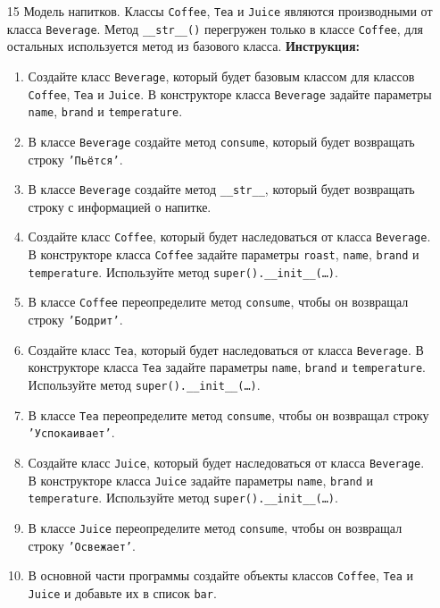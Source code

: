 \begin{enumerate}
\begin{enumerate}
\end{enumerate}
\item[15]
Модель напитков. Классы \texttt{Coffee}, \texttt{Tea} и \texttt{Juice} являются производными от класса \texttt{Beverage}. Метод \texttt{\_\_str\_\_()} перегружен только в классе \texttt{Coffee}, для остальных используется метод из базового класса.
\textbf{Инструкция:}
\begin{enumerate}
    \item Создайте класс \texttt{Beverage}, который будет базовым классом для классов \texttt{Coffee}, \texttt{Tea} и \texttt{Juice}. В конструкторе класса \texttt{Beverage} задайте параметры \texttt{name}, \texttt{brand} и \texttt{temperature}.
    \item В классе \texttt{Beverage} создайте метод \texttt{consume}, который будет возвращать строку \texttt{'Пьётся'}.
    \item В классе \texttt{Beverage} создайте метод \texttt{\_\_str\_\_}, который будет возвращать строку с информацией о напитке.
    \item Создайте класс \texttt{Coffee}, который будет наследоваться от класса \texttt{Beverage}. В конструкторе класса \texttt{Coffee} задайте параметры \texttt{roast}, \texttt{name}, \texttt{brand} и \texttt{temperature}. Используйте метод \texttt{super().\_\_init\_\_(\ldots)}.
    \item В классе \texttt{Coffee} переопределите метод \texttt{consume}, чтобы он возвращал строку \texttt{'Бодрит'}.
    \item Создайте класс \texttt{Tea}, который будет наследоваться от класса \texttt{Beverage}. В конструкторе класса \texttt{Tea} задайте параметры \texttt{name}, \texttt{brand} и \texttt{temperature}. Используйте метод \texttt{super().\_\_init\_\_(\ldots)}.
    \item В классе \texttt{Tea} переопределите метод \texttt{consume}, чтобы он возвращал строку \texttt{'Успокаивает'}.
    \item Создайте класс \texttt{Juice}, который будет наследоваться от класса \texttt{Beverage}. В конструкторе класса \texttt{Juice} задайте параметры \texttt{name}, \texttt{brand} и \texttt{temperature}. Используйте метод \texttt{super().\_\_init\_\_(\ldots)}.
    \item В классе \texttt{Juice} переопределите метод \texttt{consume}, чтобы он возвращал строку \texttt{'Освежает'}.
    \item В основной части программы создайте объекты классов \texttt{Coffee}, \texttt{Tea} и \texttt{Juice} и добавьте их в список \texttt{bar}.

\end{enumerate}
\end{enumerate}
